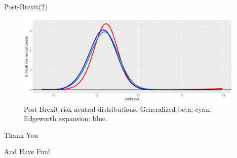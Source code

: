 \begin{frame}{Post-Brexit(2)}

\begin{figure}
\includegraphics[width=1\linewidth]{2018_02_07_IMF_FXCourse_files/figure-beamer/unnamed-chunk-82-1} \caption{Post-Brexit risk neutral distributions. Generalized beta: cyan; Edgeworth expansion: blue.}\label{fig:unnamed-chunk-82}
\end{figure}

\end{frame}

\begin{frame}{}

\color{blue}

\begin{center}
\LARGE{Thank You}
\end{center}

\begin{center}
\LARGE{And Have Fun!}
\end{center}

\end{frame}

